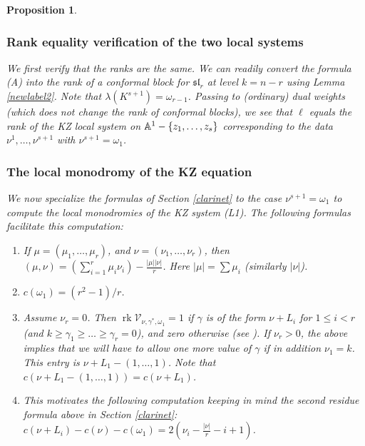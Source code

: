 \documentclass[11pt]{amsart}
\newcommand\rk{\operatorname{rk}}
\newtheorem{proposition}[theorem]{Proposition}
\numberwithin{theorem}{subsection}
\begin{document}
{\begin{proposition}
\subsubsection{Rank equality verification of the two local systems}\label{listy}
We first verify that the ranks are the same.
We can readily convert the formula (A) into the rank of a conformal block for $\mathfrak{sl}_r$  at level $k=n-r$ using Lemma \ref{newlabel2}. Note that $\lambda(K^{s+1})=\omega_{r-1}$. Passing to (ordinary) dual weights (which does not change the rank of conformal blocks), we see that $\ell$ equals the rank of the  KZ local system on $\Bbb{A}^1-\{z_1,\dots,z_s\}$ corresponding to the data $\nu^1,\dots,\nu^{s+1}$ with $\nu^{s+1}=\omega_1$.
\subsubsection{The local monodromy of the KZ equation}
We now specialize  the formulas of Section \ref{clarinet} to the case $\nu^{s+1}=\omega_1$ to compute the local monodromies of the KZ system (L1). The following formulas facilitate this computation:
\begin{enumerate}
\item[(a)] If $\mu=(\mu_1,\dots,\mu_r)$, and $\nu=(\nu_1,\dots,\nu_r)$, then $(\mu,\nu)=(\sum_{i=1}^r\mu_i\nu_i) -\frac{|\mu||\nu|}{r}$. Here $|\mu|=\sum \mu_i$ (similarly $|\nu|$).
\item[(b)] $c(\omega_1)=(r^2-1)/r$.
\item[(c)]  Assume $\nu_r=0$. Then $\rk \mathcal{V}_{\nu,\gamma^*,\omega_1}=1$ if  $\gamma$ is of the form $\nu+L_i$ for $1\leq i<r$ (and $k\geq\gamma_1\geq\dots\geq \gamma_r=0$), and zero otherwise (see \cite{Gepner}). If $\nu_r>0$, the above implies that  we will have to allow one more value of $\gamma$ if in addition  $\nu_1=k$. This entry is $\nu+L_1-(1,\dots,1)$. Note that $c(\nu+L_1-(1,\dots,1))=c(\nu+L_1)$.
\item[(d)] This motivates the following computation keeping in mind the second residue formula above in Section \ref{clarinet}: $c(\nu+L_i)-c(\nu)-c(\omega_1)= 2(\nu_i -\frac{|\nu|}{r} -i +1)$.
\end{enumerate}


\end{proposition}}
\end{document}
